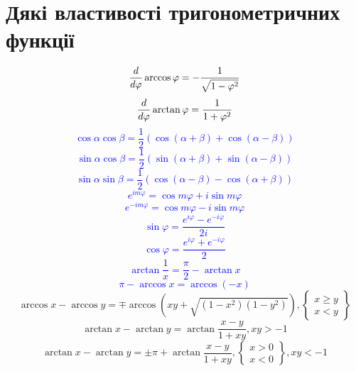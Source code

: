 \chapter{Дякі властивості тригонометричних функції}
\label{ch:trigonometric}

\textcolor{blue}{
\begin{equation*}
\frac{d }{d \varphi} \arccos \varphi = - \frac{1}{ \sqrt{1 - \varphi^2} }
\end{equation*}
%
\begin{equation*}
\frac{d }{d \varphi} \arctan \varphi = \frac{1}{1 + \varphi^2}
\end{equation*}
%
\begin{equation*}
\cos \alpha \cos \beta = \frac{1}{2} 
\left(  \cos (\alpha + \beta) + \cos (\alpha - \beta) \right)
\end{equation*}
%
\begin{equation*}
\sin \alpha \cos \beta = \frac{1}{2} 
\left( \sin (\alpha + \beta) + \sin (\alpha - \beta) \right)
\end{equation*}
%
\begin{equation*}
\sin \alpha \sin \beta = \frac{1}{2} 
\left( \cos (\alpha - \beta) - \cos (\alpha + \beta) \right)
\end{equation*}
%
\begin{equation*}
e^{im \varphi} = \cos m \varphi + i \sin m \varphi
\end{equation*}
%
\begin{equation*}
e^{-im \varphi} = \cos m \varphi - i \sin m \varphi
\end{equation*}
%
\begin{equation*}
\sin \varphi = \frac{e^{i \varphi} - e^{- i \varphi}}{2i}
\end{equation*}
%
\begin{equation*}
\cos \varphi = \frac{e^{i \varphi} + e^{- i \varphi}}{2}
\end{equation*}
%
\begin{equation*}
\arctan \frac{1}{x} = \frac{\pi}{2} - \arctan x
\end{equation*}
%
\begin{equation*}
\pi - \arccos x = \arccos (-x)
\end{equation*}
} %
%
\begin{equation}
\arccos x - \arccos y = \mp \arccos \left( 
xy + \sqrt{(1-x^2)(1-y^2)} \right),
\left\{ \begin{array}{c} x \ge y \\ x < y  \end{array} \right\}
\end{equation}
%
\begin{equation}
\arctan x - \arctan y = 
\arctan \frac{x-y}{1+xy}, xy > -1 
\end{equation}
%
\begin{equation}
\arctan x - \arctan y = \pm \pi + \arctan \frac{x-y}{1+xy}, 
\left\{ \begin{array}{c} x > 0 \\ x < 0  \end{array} \right\}, xy < -1 
\end{equation}

